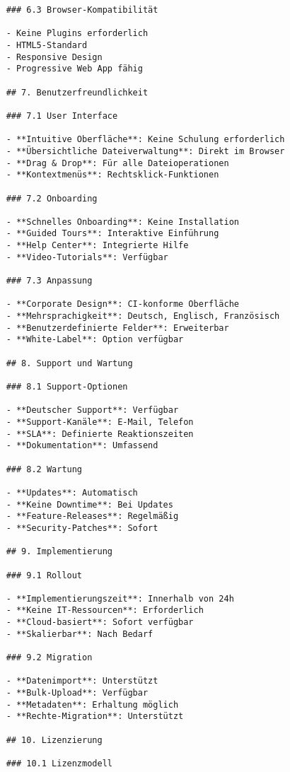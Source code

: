 \begin{verbatim}
    ### 6.3 Browser-Kompatibilität
    
    - Keine Plugins erforderlich
    - HTML5-Standard
    - Responsive Design
    - Progressive Web App fähig
    
    ## 7. Benutzerfreundlichkeit
    
    ### 7.1 User Interface
    
    - **Intuitive Oberfläche**: Keine Schulung erforderlich
    - **Übersichtliche Dateiverwaltung**: Direkt im Browser
    - **Drag & Drop**: Für alle Dateioperationen
    - **Kontextmenüs**: Rechtsklick-Funktionen
    
    ### 7.2 Onboarding
    
    - **Schnelles Onboarding**: Keine Installation
    - **Guided Tours**: Interaktive Einführung
    - **Help Center**: Integrierte Hilfe
    - **Video-Tutorials**: Verfügbar
    
    ### 7.3 Anpassung
    
    - **Corporate Design**: CI-konforme Oberfläche
    - **Mehrsprachigkeit**: Deutsch, Englisch, Französisch
    - **Benutzerdefinierte Felder**: Erweiterbar
    - **White-Label**: Option verfügbar
    
    ## 8. Support und Wartung
    
    ### 8.1 Support-Optionen
    
    - **Deutscher Support**: Verfügbar
    - **Support-Kanäle**: E-Mail, Telefon
    - **SLA**: Definierte Reaktionszeiten
    - **Dokumentation**: Umfassend
    
    ### 8.2 Wartung
    
    - **Updates**: Automatisch
    - **Keine Downtime**: Bei Updates
    - **Feature-Releases**: Regelmäßig
    - **Security-Patches**: Sofort
    
    ## 9. Implementierung
    
    ### 9.1 Rollout
    
    - **Implementierungszeit**: Innerhalb von 24h
    - **Keine IT-Ressourcen**: Erforderlich
    - **Cloud-basiert**: Sofort verfügbar
    - **Skalierbar**: Nach Bedarf
    
    ### 9.2 Migration
    
    - **Datenimport**: Unterstützt
    - **Bulk-Upload**: Verfügbar
    - **Metadaten**: Erhaltung möglich
    - **Rechte-Migration**: Unterstützt
    
    ## 10. Lizenzierung
    
    ### 10.1 Lizenzmodell
    

\end{verbatim}
